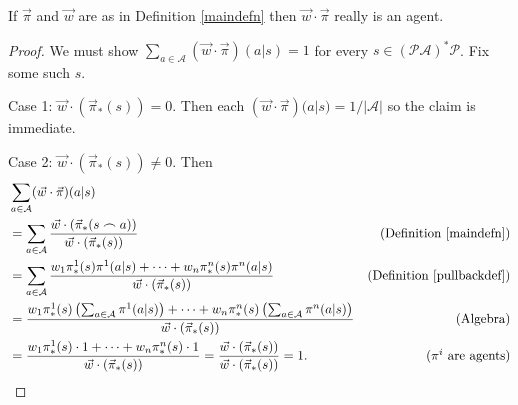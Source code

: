 \documentclass[runningheads]{llncs}
\begin{document}
\begin{lemma}
    If $\vec\pi$ and $\vec w$ are as in Definition \ref{maindefn}
    then $\vec w\cdot\vec\pi$ really is an agent.
\end{lemma}

\begin{proof}
    We must show
    $\sum_{a\in\mathcal A}(\vec w\cdot\vec\pi)(a|s)=1$ for every
    $s\in(\mathcal P\mathcal A)^*\mathcal P$. Fix some such $s$.

    Case 1: $\vec w\cdot (\vec\pi_*(s))=0$. Then
    each $(\vec w\cdot\vec\pi)(a|s)=1/|\mathcal A|$ so the
    claim is immediate.

    Case 2: $\vec w\cdot (\vec\pi_*(s))\not=0$. Then
    \begin{align*}
        &{} \sum_{a\in\mathcal A}(\vec w\cdot\vec\pi)(a|s)\\
            &= \sum_{a\in\mathcal A}
                \frac{\vec w\cdot (\vec\pi_*(s\frown a))}{\vec w\cdot (\vec\pi_*(s))}
                &\mbox{(Definition \ref{maindefn})}\\
            &= \sum_{a\in\mathcal A}
                \frac
                {w_1\pi^1_*(s)\pi^1(a|s)+\cdots+w_n\pi^n_*(s)\pi^n(a|s)}
                {\vec w\cdot(\vec\pi_*(s))}
                &\mbox{(Definition \ref{pullbackdef})}\\
            &= \frac{
                w_1\pi^1_*(s)\left(\mbox{$\sum_{a\in\mathcal A}\pi^1(a|s)$}\right)
                +\cdots+
                w_n\pi^n_*(s)\left(\mbox{$\sum_{a\in\mathcal A}\pi^n(a|s)$}\right)
                }
                {\vec w\cdot (\vec\pi_*(s))}
                &\mbox{(Algebra)}\\
            &= \frac
                {w_1\pi^1_*(s)\cdot 1 + \cdots + w_n\pi^n_*(s)\cdot1}
                {\vec w\cdot (\vec\pi_*(s))}
                =\frac{\vec w\cdot (\vec\pi_*(s))}{\vec w\cdot (\vec\pi_*(s))}=1.
                &\mbox{($\pi^i$ are agents)}
    \end{align*}
\end{proof}
\end{document}
